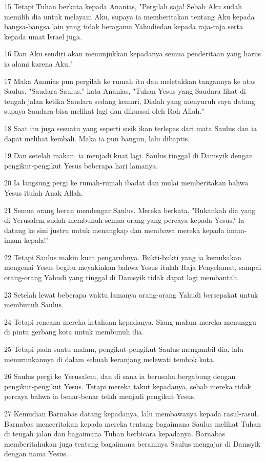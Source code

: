\par 15 Tetapi Tuhan berkata kepada Ananias, "Pergilah saja! Sebab Aku sudah memilih dia untuk melayani Aku, supaya ia memberitakan tentang Aku kepada bangsa-bangsa lain yang tidak beragama Yahudiedan kepada raja-raja serta kepada umat Israel juga.
\par 16 Dan Aku sendiri akan menunjukkan kepadanya semua penderitaan yang harus ia alami karena Aku."
\par 17 Maka Ananias pun pergilah ke rumah itu dan meletakkan tangannya ke atas Saulus. "Saudara Saulus," kata Ananias, "Tuhan Yesus yang Saudara lihat di tengah jalan ketika Saudara sedang kemari, Dialah yang menyuruh saya datang supaya Saudara bisa melihat lagi dan dikuasai oleh Roh Allah."
\par 18 Saat itu juga sesuatu yang seperti sisik ikan terlepas dari mata Saulus dan ia dapat melihat kembali. Maka ia pun bangun, lalu dibaptis.
\par 19 Dan setelah makan, ia menjadi kuat lagi. Saulus tinggal di Damsyik dengan pengikut-pengikut Yesus beberapa hari lamanya.
\par 20 Ia langsung pergi ke rumah-rumah ibadat dan mulai memberitakan bahwa Yesus itulah Anak Allah.
\par 21 Semua orang heran mendengar Saulus. Mereka berkata, "Bukankah dia yang di Yerusalem sudah membunuh semua orang yang percaya kepada Yesus? Ia datang ke sini justru untuk menangkap dan membawa mereka kepada imam-imam kepala!"
\par 22 Tetapi Saulus makin kuat pengaruhnya. Bukti-bukti yang ia kemukakan mengenai Yesus begitu meyakinkan bahwa Yesus itulah Raja Penyelamat, sampai orang-orang Yahudi yang tinggal di Damsyik tidak dapat lagi membantah.
\par 23 Setelah lewat beberapa waktu lamanya orang-orang Yahudi bersepakat untuk membunuh Saulus.
\par 24 Tetapi rencana mereka ketahuan kepadanya. Siang malam mereka menunggu di pintu gerbang kota untuk membunuh dia.
\par 25 Tetapi pada suatu malam, pengikut-pengikut Saulus mengambil dia, lalu menurunkannya di dalam sebuah keranjang melewati tembok kota.
\par 26 Saulus pergi ke Yerusalem, dan di sana ia berusaha bergabung dengan pengikut-pengikut Yesus. Tetapi mereka takut kepadanya, sebab mereka tidak percaya bahwa ia benar-benar telah menjadi pengikut Yesus.
\par 27 Kemudian Barnabas datang kepadanya, lalu membawanya kepada rasul-rasul. Barnabas menceritakan kepada mereka tentang bagaimana Saulus melihat Tuhan di tengah jalan dan bagaimana Tuhan berbicara kepadanya. Barnabas memberitahukan juga tentang bagaimana beraninya Saulus mengajar di Damsyik dengan nama Yesus.
